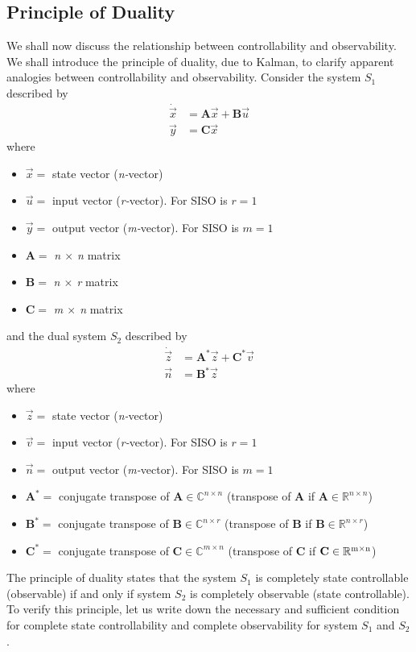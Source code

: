 \documentclass[12pt,a4paper,oneside]{book}
\begin{document}
\begin{onehalfspace}
\section{Principle of Duality}
We shall now discuss the relationship between controllability and 
observability. We shall introduce the principle of duality, due to Kalman, to 
clarify apparent analogies between controllability and observability.
Consider the system $S_1$ described by
\begin{equation} 
	\begin{split}
		\dot{\vec x} & = \mathbf{A}\vec x + \mathbf{B}\vec u \\
		\vec y & = \mathbf{C}\vec x
	\end{split}
\end{equation}
where	\begin{itemize} 
	\item $\vec x = $ state vector (\textit{n-}vector)
	\item $\vec u = $ input vector (\textit{r-}vector). For SISO is $r=1$
	\item $\vec y = $ output vector (\textit{m-}vector). For SISO is $m=1$
	\item $ \mathbf{A} = $ \textit{n $\times$ n} matrix
	\item $ \mathbf{B} = $ \textit{n $\times$ r} matrix
	\item $ \mathbf{C} = $ \textit{m $\times$ n} matrix
\end{itemize}
and the dual system $S_2$ described by
\begin{equation} 
	\begin{split}
		\dot{\vec z} & = \textbf{A}^*\vec z + \textbf{C}^*\vec v \\
		\vec n & = \mathbf{B}^*\vec z
	\end{split}
\end{equation}
where	\begin{itemize} 
	\item $\vec z = $ state vector (\textit{n-}vector)
	\item $\vec v = $ input vector (\textit{r-}vector). For SISO is $r=1$
	\item $\vec n = $ output vector (\textit{m-}vector). For SISO is $m=1$
	\item $ \mathbf{A}^* = $ conjugate transpose of $\mathbf{A} 
	\in\mathbb{C}^{n \times n}$ (transpose of $\mathbf{A}$ if 
	$\mathbf{A}\in\mathbb{R}^{n \times n}$) 
	\item $ \mathbf{B}^* = $ conjugate transpose of $\mathbf{B}\in\mathbb{C}^{n 
	\times r}$ (transpose of $\mathbf{B}$ if $\mathbf{B}\in\mathbb{R}^{n \times 
	r}$)
	\item $ \mathbf{C}^* = $ conjugate transpose of $\mathbf{C}\in\mathbb{C}^{m 
	\times n}$ (transpose of $\mathbf{C}$ if $\mathbf{C} \in  \rm \mathbb{R}^{m 
	\times n}$)
\end{itemize}
The principle of duality states that the system $S_1$ is completely state controllable (observable) if and only if system $S_2$ is completely observable (state controllable).
To verify this principle, let us write down the necessary and sufficient 
condition for complete state controllability and complete observability for 
system $S_1$ and $S_2$. 


\end{onehalfspace}
\end{document}
